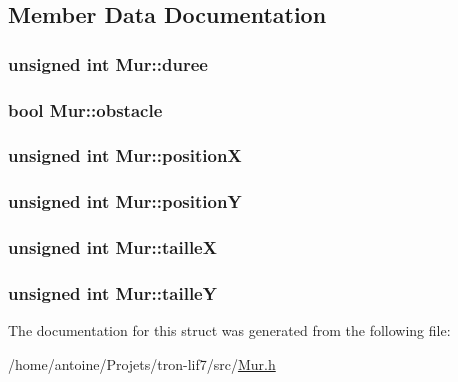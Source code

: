 \subsection{Member Data Documentation}
\hypertarget{structMur_a6aceb89c289c02c5da1301142f80202b}{
\subsubsection[{duree}]{\setlength{\rightskip}{0pt plus 5cm}unsigned int Mur\-::duree}}\label{structMur_a6aceb89c289c02c5da1301142f80202b}
\hypertarget{structMur_af358f2d8774ed45c36982eaf35c64200}{
\subsubsection[{obstacle}]{\setlength{\rightskip}{0pt plus 5cm}bool Mur\-::obstacle}}\label{structMur_af358f2d8774ed45c36982eaf35c64200}
\hypertarget{structMur_a864938629ea67ef302ba949854a62a03}{
\subsubsection[{position\-X}]{\setlength{\rightskip}{0pt plus 5cm}unsigned int Mur\-::position\-X}}\label{structMur_a864938629ea67ef302ba949854a62a03}
\hypertarget{structMur_aaa7a30342c05f809a65352e9d35f3eef}{
\subsubsection[{position\-Y}]{\setlength{\rightskip}{0pt plus 5cm}unsigned int Mur\-::position\-Y}}\label{structMur_aaa7a30342c05f809a65352e9d35f3eef}
\hypertarget{structMur_a83d5a0639f49e58cfb805a91702d6701}{
\subsubsection[{taille\-X}]{\setlength{\rightskip}{0pt plus 5cm}unsigned int Mur\-::taille\-X}}\label{structMur_a83d5a0639f49e58cfb805a91702d6701}
\hypertarget{structMur_ad0c6b841ae4069d6b4e6559d7e88cf47}{
\subsubsection[{taille\-Y}]{\setlength{\rightskip}{0pt plus 5cm}unsigned int Mur\-::taille\-Y}}\label{structMur_ad0c6b841ae4069d6b4e6559d7e88cf47}


The documentation for this struct was generated from the following file\-:\begin{DoxyCompactItemize}
\item 
/home/antoine/\-Projets/tron-\/lif7/src/\hyperlink{Mur_8h}{Mur.\-h}\end{DoxyCompactItemize}
